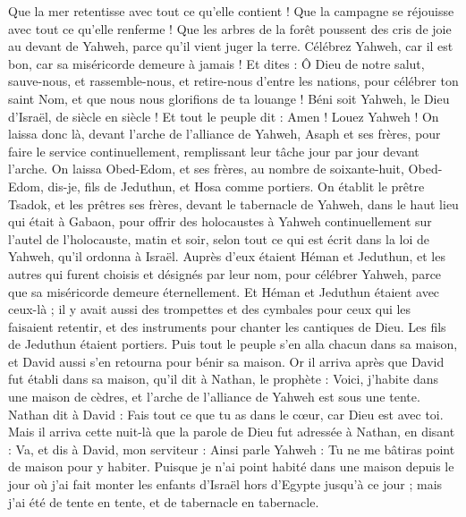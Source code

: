 \begin{multicols}{2}
Que la mer retentisse avec tout ce qu'elle contient ! Que la campagne se réjouisse avec tout ce qu'elle renferme !
Que les arbres de la forêt poussent des cris de joie au devant de Yahweh, parce qu'il vient juger la terre.
Célébrez Yahweh, car il est bon, car sa miséricorde demeure à jamais !
Et dites : Ô Dieu de notre salut, sauve-nous, et rassemble-nous, et retire-nous d'entre les nations, pour célébrer ton saint Nom, et que nous nous glorifions de ta louange !
Béni soit Yahweh, le Dieu d'Israël, de siècle en siècle ! Et tout le peuple dit : Amen ! Louez Yahweh !
On laissa donc là, devant l'arche de l'alliance de Yahweh, Asaph et ses frères, pour faire le service continuellement, remplissant leur tâche jour par jour devant l'arche.
On laissa Obed-Edom, et ses frères, au nombre de soixante-huit, Obed-Edom, dis-je, fils de Jeduthun, et Hosa comme portiers.
On établit le prêtre Tsadok, et les prêtres ses frères, devant le tabernacle de Yahweh, dans le haut lieu qui était à Gabaon,
pour offrir des holocaustes à Yahweh continuellement sur l'autel de l'holocauste, matin et soir, selon tout ce qui est écrit dans la loi de Yahweh, qu'il ordonna à Israël.
Auprès d'eux étaient Héman et Jeduthun, et les autres qui furent choisis et désignés par leur nom, pour célébrer Yahweh, parce que sa miséricorde demeure éternellement.
Et Héman et Jeduthun étaient avec ceux-là ; il y avait aussi des trompettes et des cymbales pour ceux qui les faisaient retentir, et des instruments pour chanter les cantiques de Dieu. Les fils de Jeduthun étaient portiers.
Puis tout le peuple s'en alla chacun dans sa maison, et David aussi s'en retourna pour bénir sa maison.
\VerseOne{}Or il arriva après que David fut établi dans sa maison, qu'il dit à Nathan, le prophète : Voici, j'habite dans une maison de cèdres, et l'arche de l'alliance de Yahweh est sous une tente.
Nathan dit à David : Fais tout ce que tu as dans le cœur, car Dieu est avec toi.
Mais il arriva cette nuit-là que la parole de Dieu fut adressée à Nathan, en disant :
Va, et dis à David, mon serviteur : Ainsi parle Yahweh : Tu ne me bâtiras point de maison pour y habiter.
Puisque je n'ai point habité dans une maison depuis le jour où j'ai fait monter les enfants d'Israël hors d'Egypte jusqu'à ce jour ; mais j'ai été de tente en tente, et de tabernacle en tabernacle.

\end{multicols}
